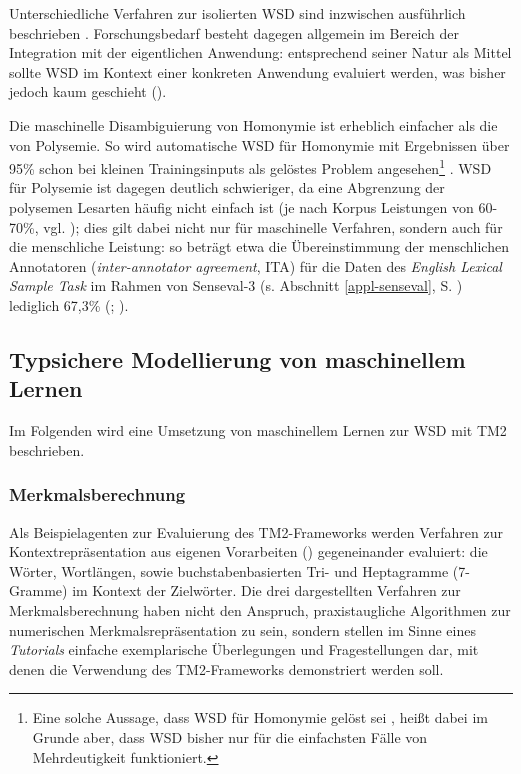 \documentclass[abstracton, 12pt]{scrartcl}
\begin{document}
Unterschiedliche Verfahren zur isolierten WSD sind inzwischen ausführlich beschrieben \citep{WilksEtAl1996,IdeAndVeronis1998,ManningAndSchuetze1999,Stevenson2003,AgirreAndEdmonds2006b}. Forschungsbedarf besteht dagegen allgemein im Bereich der Integration mit der eigentlichen Anwendung: entsprechend seiner Natur als Mittel sollte WSD im Kontext einer konkreten Anwendung evaluiert werden, was bisher jedoch kaum geschieht (\citealt{Stevenson2003, AgirreAndEdmonds2006b}). 

Die maschinelle Disambiguierung von Homonymie ist erheblich einfacher als die von Polysemie. So wird automatische WSD für Homonymie mit Ergebnissen über 95\% schon bei kleinen Trainingsinputs als gelöstes Problem angesehen\footnote{Eine solche Aussage, dass WSD für Homonymie gelöst sei \citep[14]{AgirreAndEdmonds2006b}, heißt dabei im Grunde aber, dass WSD bisher nur für die einfachsten Fälle von Mehrdeutigkeit funktioniert.} \citep[14]{AgirreAndEdmonds2006b}. WSD für Polysemie ist dagegen deutlich schwieriger, da eine Abgrenzung der polysemen Lesarten häufig nicht einfach ist (je nach Korpus Leistungen von 60-70\%, vgl. \citealt[14]{AgirreAndEdmonds2006b}); dies gilt dabei nicht nur für maschinelle Verfahren, sondern auch für die menschliche Leistung: so beträgt etwa die Übereinstimmung der menschlichen Annotatoren (\emph{inter-annotator agreement}, ITA) für die Daten des \emph{English Lexical Sample Task} im Rahmen von Senseval-3 (s. Abschnitt \ref{appl-senseval}, S. \pageref{appl-senseval}) lediglich 67,3\% (\citealt{MihalceaEtAl2004}; \citealt[14]{AgirreAndEdmonds2006b}).

\subsection{Typsichere Modellierung von maschinellem Lernen} \label{appl-wsd} 

Im Folgenden wird eine Umsetzung von maschinellem Lernen zur WSD mit TM2 beschrieben.

\subsubsection{Merkmalsberechnung} \label{appl-merkmale}  

Als Beispielagenten zur Evaluierung des TM2-Frameworks werden Verfahren zur Kontextrepräsentation aus eigenen Vorarbeiten (\citealt{Steeg2007}) gegeneinander evaluiert: die Wörter, Wort\-läng\-en, sowie buchstabenbasierten Tri- und Heptagramme (7-Gramme) im Kontext der Ziel\-wörter. Die drei dargestellten Verfahren zur Merkmalsberechnung haben nicht den Anspruch, praxistaugliche Algorithmen zur numerischen Merkmalsrepräsentation zu sein, sondern stellen im Sinne eines \emph{Tutorials} einfache exemplarische Überlegungen und Fragestellungen dar, mit denen die Verwendung des TM2-Frameworks demonstriert werden soll.
\end{document}
